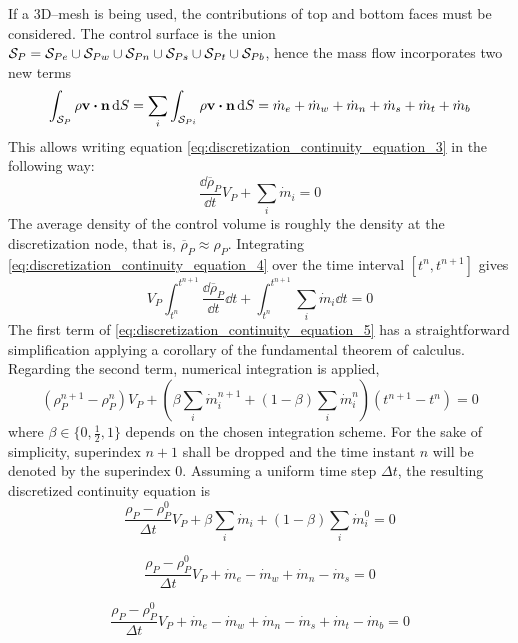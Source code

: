 If a 3D--mesh is being used, the contributions of top and bottom faces must be considered. The control surface is the union $\mathcal{S}_{P} = \mathcal{S}_{Pe} \cup \mathcal{S}_{Pw} \cup \mathcal{S}_{Pn} \cup \mathcal{S}_{Ps} \cup \mathcal{S}_{Pt} \cup \mathcal{S}_{Pb}$, hence the mass flow incorporates two new terms
\begin{equation}
	\int_{\cs{P}} \rho \vb{v} \vdot \vb{n} \dd{S} = 
	\sum_{i} \int_{\cs{Pi}} \rho \vb{v} \vdot \vb{n} \dd{S} = 
	\dot{m}_e + \dot{m}_w + \dot{m}_n + \dot{m}_s + \dot{m}_t + \dot{m}_b
\end{equation}
This allows writing equation \eqref{eq:discretization_continuity_equation_3} in the following way:
\begin{equation} \label{eq:discretization_continuity_equation_4}
	\frac{\dd \overline{\rho}_P}{\dd{t}} V_P + \sum_i \dot{m}_i = 0
\end{equation}
The average density of the control volume is roughly the density at the discretization node, that is, $\overline{\rho}_P \approx \rho_P$. Integrating \eqref{eq:discretization_continuity_equation_4} over the time interval $[t^n, t^{n+1}]$ gives
\begin{equation} \label{eq:discretization_continuity_equation_5}
	V_P \int_{t^n}^{t^{n+1}} \frac{\dd \overline{\rho}_P}{\dd{t}} \dd{t} + 
	\int_{t^n}^{t^{n+1}} \sum_i \dot{m}_i \dd{t} = 0
\end{equation}
The first term of \eqref{eq:discretization_continuity_equation_5} has a straightforward simplification applying a corollary of the fundamental theorem of calculus. Regarding the second term, numerical integration is applied,
\begin{equation} \label{eq:discretization_continuity_equation_6}
	(\rho_P^{n+1} - \rho_P^n) V_P + 
	\left( \beta \sum_i \dot{m}_i^{n+1} + (1 - \beta) \sum_i \dot{m}_i^{n} \right) (t^{n+1} - t^n) = 0
\end{equation}
where $\beta \in \{ 0, \frac{1}{2}, 1 \}$ depends on the chosen integration scheme. For the sake of simplicity, superindex $n+1$ shall be dropped and the time instant $n$ will be denoted by the superindex $0$. Assuming a uniform time step $\Delta t$, the resulting discretized continuity equation is
\begin{equation}
	\frac{\rho_P - \rho_P^0}{\Delta t} V_P + \beta \sum_i \dot{m}_i + (1 - \beta) \sum_i \dot{m}_i^0 = 0
\end{equation}


\begin{equation} \label{eq:continuity_equation_2d_discretized}
	\frac{\rho_P - \rho_P^0}{\Delta t} V_P + 
	\dot{m}_e - \dot{m}_w + 
	\dot{m}_n - \dot{m}_s = 0
\end{equation}

\begin{equation} \label{eq:continuity_equation_3d_discretized}
	\frac{\rho_P - \rho_P^0}{\Delta t} V_P + 
	\dot{m}_e - \dot{m}_w + 
	\dot{m}_n - \dot{m}_s + 
	\dot{m}_t - \dot{m}_b = 0
\end{equation}


